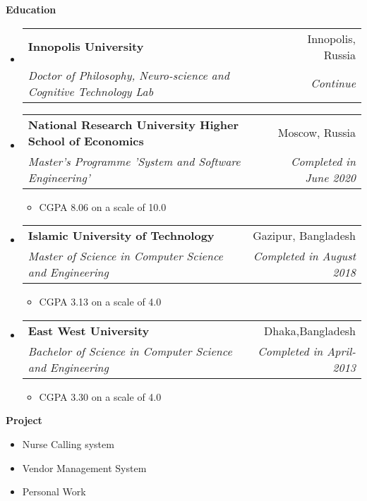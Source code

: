 \documentclass[letterpaper,10pt]{article}
\makeatletter
\newcommand{\resitem}[1]{\item #1 \vspace{-2pt}}
\newcommand{\resheading}[1]{{\large \colorbox{mygrey}{\begin{minipage}{\textwidth}{\textbf{#1 \vphantom{p\^{E}}}}\end{minipage}}}}
\newcommand{\ressubheading}[4]{
\begin{tabular*}{6.5in}{l@{\extracolsep{\fill}}r}
		\textbf{#1} & #2 \\
		\textit{#3} & \textit{#4} \\
\end{tabular*}\vspace{-6pt}}
\makeatother
\begin{document}
\resheading{Education}
\begin{itemize}


\item
	\ressubheading{Innopolis University}{Innopolis, Russia}{Doctor of Philosophy, Neuro-science and Cognitive Technology Lab}{Continue}

\item
	\ressubheading{National Research University Higher School of Economics}{Moscow, Russia}{Master’s Programme 'System and Software Engineering'}{Completed in June 2020}
	\begin{itemize}

		\item  CGPA 8.06 on a scale of 10.0

	\end{itemize}


\item
	\ressubheading{Islamic University of Technology}{Gazipur, Bangladesh}{Master of Science in Computer Science and Engineering }{Completed in August 2018}
\begin{itemize}

		\item  CGPA 3.13  on a scale of 4.0

	\end{itemize}
	
\item
	\ressubheading{East West University}{Dhaka,Bangladesh}{Bachelor of Science in Computer Science and Engineering}{Completed in April-2013}
	\begin{itemize}
		\item  CGPA 3.30 on a scale of 4.0

	\end{itemize}


\end{itemize}


\resheading{Project}

\begin{itemize}
\resitem{Nurse Calling system}
\resitem{Vendor Management System}
\resitem{Personal Work}
\end{itemize}
\end{document}
